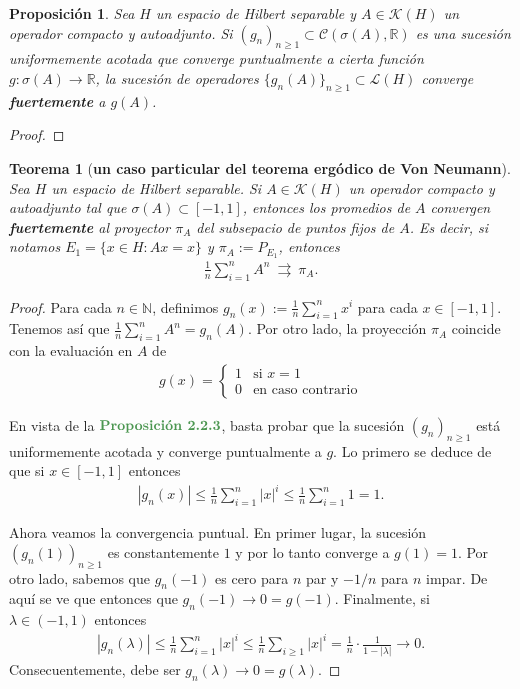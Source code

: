 \documentclass[11pt]{report}
\theoremstyle{colored}
\newtheorem{theorem}{Teorema}[section]
\newtheorem{proposition}{Proposición}[section]
\newcommand{\N}{\mathbb{N}}
\newcommand{\R}{\mathbb{R}}
\newcommand{\paint}[1]{\color{color}{#1}}
\newcommand{\tpaint}[1]{\paint{\textbf{#1}}}
\begin{document}
\begin{proposition}
Sea $H$ un espacio de Hilbert separable y $A \in \mathscr{K}(H)$ un operador compacto y autoadjunto. Si $(g_n)_{n \geq 1} \subset \mathcal{C}(\sigma(A),\R)$ es una sucesión uniformemente acotada que converge puntualmente a cierta función $g : \sigma(A) \to \R$, la sucesión de operadores $\{g_n(A)\}_{n \geq 1} \subset \mathscr{L}(H)$ converge \textbf{fuertemente} a $g(A)$.
\end{proposition}
\begin{proof}

\end{proof}

\begin{theorem}[\textbf{un caso particular del teorema ergódico de Von Neumann}] Sea $H$ un espacio de Hilbert separable. Si $A \in \mathscr{K}(H)$ un operador compacto y autoadjunto tal que $\sigma(A) \subset [-1,1]$, entonces los promedios de $A$ convergen \textbf{fuertemente} al proyector $\pi_A$ del subsepacio de puntos fijos de $A$. Es decir, si notamos $E_1 = \{x \in H : Ax = x\}$ y $\pi_A := P_{E_1}$, entonces
\begin{align*}
\frac{1}{n}\sum_{i=1}^{n}A^n \ \rightrightarrows \ \pi_A.
\end{align*}
\end{theorem}
\begin{proof} Para cada $n \in \N$, definimos $g_n(x) := \frac{1}{n}\sum_{i=1}^nx^i$ para cada $x \in [-1,1]$. Tenemos así que $\frac{1}{n}\sum_{i=1}^{n}A^n = g_n(A)$. Por otro lado, la proyección $\pi_A$ coincide con la evaluación en $A$ de 
\begin{align*}
g(x) = \begin{cases}
1 &\text{si $x = 1$}\\
0 &\text{en caso contrario}
\end{cases}
\end{align*}

En vista de la $\tpaint{Proposición 2.2.3}$, basta probar que la sucesión $(g_n)_{n \geq 1}$ está uniformemente acotada y converge puntualmente a $g$. Lo primero se deduce de que si $x \in [-1,1]$ entonces
\begin{align*}
|g_n(x)| \leq \frac{1}{n}\sum_{i=1}^n|x|^i \leq \frac{1}{n}\sum_{i=1}^n1 = 1.
\end{align*}

Ahora veamos la convergencia puntual. En primer lugar, la sucesión $(g_n(1))_{n \geq 1}$ es constantemente $1$ y por lo tanto converge a $g(1) = 1$. Por otro lado, sabemos que $g_n(-1)$ es cero para $n$ par y $-1/n$ para $n$ impar. De aquí se ve que entonces que $g_n(-1) \to 0 = g(-1)$. Finalmente, si $\lambda \in (-1,1)$ entonces
\begin{align*}
|g_n(\lambda)| \leq \frac{1}{n}\sum_{i=1}^n|x|^i \leq \frac{1}{n}\sum_{i \geq 1}|x|^i = \frac{1}{n} \cdot \frac{1}{1-|\lambda|} \to 0.
\end{align*}
Consecuentemente, debe ser $g_n(\lambda) \to 0 = g(\lambda)$.
\end{proof}
\end{document}
